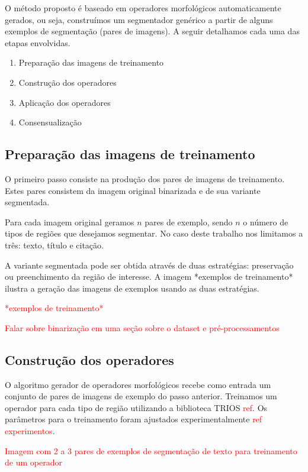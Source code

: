 \documentclass[a4paper,11pt]{article}
\newcommand{\TODO}[1]{\textcolor{red}{#1}}
\begin{document}
O método proposto é baseado em operadores morfológicos automaticamente gerados, ou seja, construímos um segmentador genérico a partir de alguns exemplos de segmentação (pares de imagens). A seguir detalhamos cada uma das etapas envolvidas.

    \begin{enumerate}
      \item Preparação das imagens de treinamento
      \item Construção dos operadores
      \item Aplicação dos operadores
      \item Consensualização
    \end{enumerate}

    \subsection{Preparação das imagens de treinamento}

      O primeiro passo consiste na produção dos pares de imagens de treinamento. Estes pares consistem da imagem original binarizada e de sua variante segmentada.

      Para cada imagem original geramos $n$ pares de exemplo, sendo $n$ o número de tipos de regiões que desejamos segmentar. No caso deste trabalho nos limitamos a três: texto, título e citação.

      A variante segmentada pode ser obtida através de duas estratégias: preservação ou preenchimento da região de interesse. A imagem *exemplos de treinamento* ilustra a geração das imagens de exemplos usando as duas estratégias.

      \TODO{*exemplos de treinamento*}

      \TODO{Falar sobre binarização em uma seção sobre o dataset e pré-processamentos}

    \subsection{Construção dos operadores}

      O algoritmo gerador de operadores morfológicos recebe como entrada um conjunto de pares de imagens de exemplo do passo anterior. Treinamos um operador para cada tipo de região utilizando a biblioteca TRIOS \TODO{ref}. Os parâmetros para o treinamento foram ajustados experimentalmente \TODO{ref experimentos}.

      \TODO{Imagem com 2 a 3 pares de exemplos de segmentação de texto para treinamento de um operador}
\end{document}
